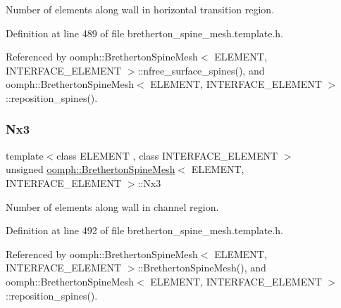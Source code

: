 Number of elements along wall in horizontal transition region. 



Definition at line 489 of file bretherton\+\_\+spine\+\_\+mesh.\+template.\+h.



Referenced by oomph\+::\+Bretherton\+Spine\+Mesh$<$ E\+L\+E\+M\+E\+N\+T, I\+N\+T\+E\+R\+F\+A\+C\+E\+\_\+\+E\+L\+E\+M\+E\+N\+T $>$\+::nfree\+\_\+surface\+\_\+spines(), and oomph\+::\+Bretherton\+Spine\+Mesh$<$ E\+L\+E\+M\+E\+N\+T, I\+N\+T\+E\+R\+F\+A\+C\+E\+\_\+\+E\+L\+E\+M\+E\+N\+T $>$\+::reposition\+\_\+spines().

\mbox{\label{classoomph_1_1BrethertonSpineMesh_a26c57f832b7cdc495087cef7b54c98fd}} 
\subsubsection{\texorpdfstring{Nx3}{Nx3}}
{\footnotesize\ttfamily template$<$class E\+L\+E\+M\+E\+NT , class I\+N\+T\+E\+R\+F\+A\+C\+E\+\_\+\+E\+L\+E\+M\+E\+NT $>$ \\
unsigned \hyperlink{classoomph_1_1BrethertonSpineMesh}{oomph\+::\+Bretherton\+Spine\+Mesh}$<$ E\+L\+E\+M\+E\+NT, I\+N\+T\+E\+R\+F\+A\+C\+E\+\_\+\+E\+L\+E\+M\+E\+NT $>$\+::Nx3\hspace{0.3cm}{\ttfamily [protected]}}



Number of elements along wall in channel region. 



Definition at line 492 of file bretherton\+\_\+spine\+\_\+mesh.\+template.\+h.



Referenced by oomph\+::\+Bretherton\+Spine\+Mesh$<$ E\+L\+E\+M\+E\+N\+T, I\+N\+T\+E\+R\+F\+A\+C\+E\+\_\+\+E\+L\+E\+M\+E\+N\+T $>$\+::\+Bretherton\+Spine\+Mesh(), and oomph\+::\+Bretherton\+Spine\+Mesh$<$ E\+L\+E\+M\+E\+N\+T, I\+N\+T\+E\+R\+F\+A\+C\+E\+\_\+\+E\+L\+E\+M\+E\+N\+T $>$\+::reposition\+\_\+spines().

\mbox{\label{classoomph_1_1BrethertonSpineMesh_af5e7951a89bc13d73f2b137947cda8a3}} 
